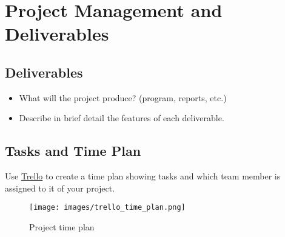 \documentclass[hidelinks,a4paper,12pt]{article}
\begin{document}
\section{Project Management and Deliverables}
\subsection{Deliverables}
\begin{itemize}
\item What will the project produce? (program, reports, etc.)
\item Describe in brief detail the features of each deliverable.
\end{itemize}
\subsection{Tasks and Time Plan}
Use \textcolor{blue}{\href{https://trello.com/power-ups/58bd1f9aca72f48c8900574f}{Trello}} to create a time plan showing tasks and which team member is assigned to it of your project.\\ 

\begin{figure}[h]
\centering
\texttt{[image: images/trello\_time\_plan.png]}
\caption{Project time plan}
\label{fig:timeplan}
\end{figure}
\newpage

\printbibliography
\end{document}
